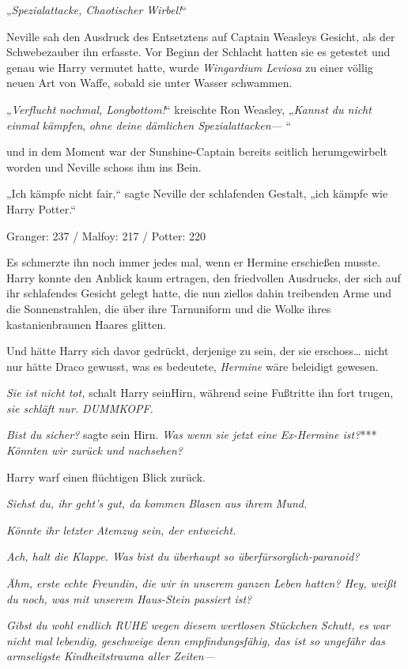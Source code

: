 {„\emph{Spezialattacke, Chaotischer} \emph{Wirbel!}“

Neville sah den Ausdruck des Entsetztens auf Captain Weasleys Gesicht, als der Schwebezauber ihn erfasste. Vor Beginn der Schlacht hatten sie es getestet und genau wie Harry vermutet hatte, wurde \emph{Wingardium Leviosa} zu einer völlig neuen Art von Waffe, sobald sie unter Wasser schwammen.

„\emph{Verflucht} \emph{nochmal, Longbottom!}“ kreischte Ron Weasley, „\emph{Kannst du nicht einmal} \emph{kämpfen}, \emph{ohne deine dämlichen Spezialattacken—} “

und in dem Moment war der Sunshine-Captain bereits seitlich herumgewirbelt worden und Neville schoss ihm ins Bein.

„Ich kämpfe nicht fair,“ sagte Neville der schlafenden Gestalt, „ich kämpfe wie Harry Potter.“

\later

Granger: 237 / Malfoy: 217 / Potter: 220

Es schmerzte ihn noch immer jedes mal, wenn er Hermine erschießen musste. Harry konnte den Anblick kaum ertragen, den friedvollen Ausdrucks, der sich auf ihr schlafendes Gesicht gelegt hatte, die nun ziellos dahin treibenden Arme und die Sonnenstrahlen, die über ihre Tarnuniform und die Wolke ihres kastanienbraunen Haares glitten.

Und hätte Harry sich davor gedrückt, derjenige zu sein, der sie erschoss… nicht nur hätte Draco gewusst, was es bedeutete, \emph{Hermine} wäre beleidigt gewesen.

\emph{Sie ist nicht tot,} schalt Harry seinHirn, während seine Fußtritte ihn fort trugen, \emph{sie schläft nur. DUMMKOPF.}

\emph{Bist du sicher?} sagte sein Hirn. \emph{Was wenn sie jetzt eine Ex-Hermine ist?}*** \emph{Könnten wir zurück und nachsehen?}

Harry warf einen flüchtigen Blick zurück.

\emph{Siehst du, ihr geht's gut, da kommen Blasen aus ihrem Mund.}

\emph{Könnte ihr letzter Atemzug sein, der entweicht.}

\emph{Ach, halt die Klappe. Was bist du überhaupt so überfürsorglich-paranoid?}

\emph{Ähm, erste echte Freundin, die wir in unserem ganzen Leben hatten? Hey, weißt du noch, was mit unserem Haus-Stein passiert ist?}

\emph{Gibst du wohl endlich RUHE wegen diesem wertlosen Stückchen Schutt, es war nicht mal lebendig, geschweige denn empfindungsfähig, das ist so ungefähr das armseligste Kindheitstrauma aller Zeiten—}

}
